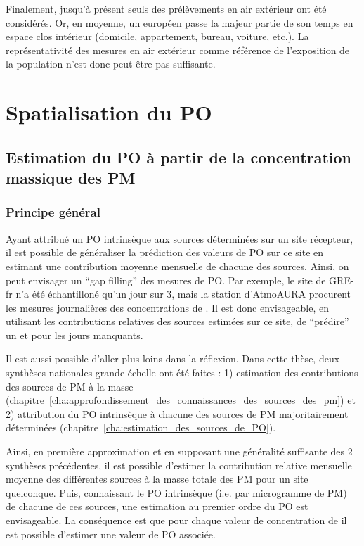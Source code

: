 Finalement, jusqu'à présent seuls des prélèvements en air extérieur ont été considérés.
Or, en moyenne, un européen passe la majeur partie de son temps en espace clos intérieur
(domicile, appartement, bureau, voiture, etc.).  La représentativité des mesures en air
extérieur comme référence de l'exposition de la population n'est donc peut-être pas
suffisante.

\section{Spatialisation du PO}

\subsection{Estimation du PO à partir de la concentration massique des PM}

\subsubsection{Principe général}

Ayant attribué un PO intrinsèque aux sources déterminées sur un site récepteur, il est
possible de généraliser la prédiction des valeurs de PO sur ce site en estimant une
contribution moyenne mensuelle de chacune des sources. Ainsi, on peut envisager un ``gap
filling'' des mesures de PO. Par exemple, le site de GRE-fr n'a été échantilloné qu'un
jour sur 3, mais la station d'AtmoAURA procurent les mesures journalières des
concentrations de \PMdix. Il est donc envisageable, en utilisant les contributions
relatives des sources estimées sur ce site, de ``prédire'' un \POAAv{} et \PODTTv{} pour
les jours manquants.

Il est aussi possible d'aller plus loins dans la réflexion. Dans cette thèse, deux
synthèses nationales grande échelle ont été faites : 1) estimation des contributions des
sources de PM à la masse \autocite{weberComparison2019}
(chapitre~\ref{cha:approfondissement_des_connaissances_des_sources_des_pm}) et 2) attribution du PO intrinsèque à
chacune des sources de PM majoritairement déterminées \autocite{weberSourceinprep.}
(chapitre~\ref{cha:estimation_des_sources_de_PO}).

Ainsi, en première approximation et en supposant une généralité suffisante des 2
synthèses précédentes, il est possible d'estimer la contribution relative mensuelle
moyenne des différentes sources à la masse totale des PM pour un site quelconque.  Puis,
connaissant le PO intrinsèque (i.e. par microgramme de PM) de chacune de ces sources, une
estimation au premier ordre du PO est envisageable.  La conséquence est que pour chaque
valeur de concentration de \PMdix{} il est possible d'estimer une valeur de PO associée.

